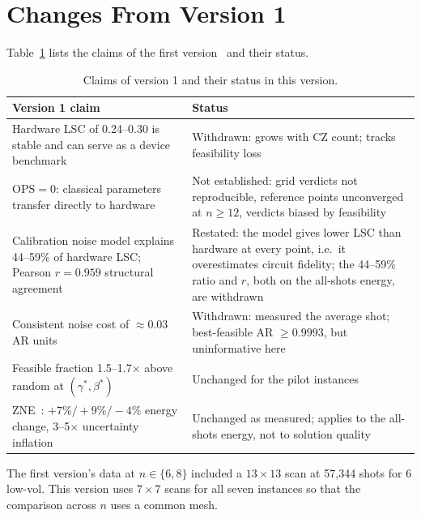 \documentclass[conference]{IEEEtran}
\newcommand{\OPS}{\mathrm{OPS}}
\begin{document}
\section{Changes From Version 1}
\label{sec:v1}

Table~\ref{tab:v1} lists the claims of the first
version~\cite{meliksetian2026v1} and their status.

\begin{table}[htbp]
\caption{Claims of version 1 and their status in this version.}
\label{tab:v1}
\begin{center}
\begin{tabular}{@{}p{}p{}@{}}
\toprule
\textbf{Version 1 claim} & \textbf{Status} \\
\midrule
Hardware LSC of 0.24--0.30 is stable and can serve as a device benchmark
  & Withdrawn: grows with CZ count; tracks feasibility loss \\
$\OPS{=}0$: classical parameters transfer directly to hardware
  & Not established: grid verdicts not reproducible, reference points
    unconverged at $n{\ge}12$, verdicts biased by feasibility \\
Calibration noise model explains 44--59\% of hardware LSC; Pearson
$r{=}0.959$ structural agreement
  & Restated: the model gives lower LSC than hardware at every point,
    i.e.\ it overestimates circuit fidelity; the 44--59\% ratio and $r$,
    both on the all-shots energy, are withdrawn \\
Consistent noise cost of $\approx0.03$ AR units
  & Withdrawn: measured the average shot; best-feasible AR
    $\geq0.9993$, but uninformative here \\
Feasible fraction 1.5--1.7$\times$ above random at $(\gamma^*,\beta^*)$
  & Unchanged for the pilot instances \\
ZNE~\cite{temme2017error, li2017efficient, giurgica2020digital}: $+7\%/+9\%/-4\%$ energy change, 3--5$\times$ uncertainty inflation
  & Unchanged as measured; applies to the all-shots energy, not to
    solution quality \\
\bottomrule
\end{tabular}
\end{center}
\end{table}

The first version's data at $n{\in}\{6,8\}$ included a $13{\times}13$
scan at 57{,}344 shots for 6 low-vol. This version uses $7{\times}7$
scans for all seven instances so that the comparison across $n$ uses a
common mesh.
\end{document}
